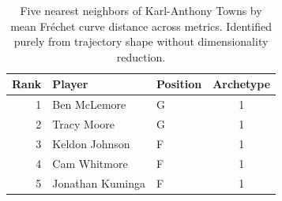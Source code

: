 \begin{table}[htbp]
  \centering\small
  \begin{tabular}{rllc}
    \toprule
    Rank & Player & Position & Archetype \\
    \midrule
    1 & Ben McLemore & G & 1 \\
    2 & Tracy Moore & G & 1 \\
    3 & Keldon Johnson & F & 1 \\
    4 & Cam Whitmore & F & 1 \\
    5 & Jonathan Kuminga & F & 1 \\
    \bottomrule
  \end{tabular}
  \caption{Five nearest neighbors of Karl-Anthony Towns by mean Fr\'{e}chet curve distance across metrics. Identified purely from trajectory shape without dimensionality reduction.}
  \label{tab:Karl_Anthony_Towns_frechet_curve_neighbors}
\end{table}

